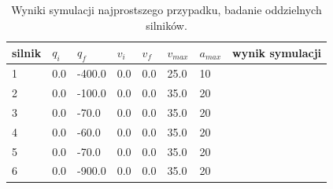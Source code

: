 \documentclass[a4paper, 12pt]{article}
\begin{document}
	\begin{table}[H]
	\centering
	\begin{tabular}{|m{2.5em}|m{4em}|m{4em}|m{4em}|m{4em}|m{4em}|m{4em}|m{5em}|}
	\hline
	silnik&$ q_i $ & $ q_f $ & $ v_i $ & $ v_f $ & $ v_{max} $ & $ a_{max} $&wynik symulacji\\
	\hline
	\hline
	\hspace{1em}1& 0.0 & -400.0 & 0.0 & 0.0 & 25.0 & 10&\hspace{2em}\checkmark\\ %
	\hline
	\hspace{1em}2& 0.0 & -100.0 & 0.0 & 0.0 & 35.0 & 20&\hspace{2em}\checkmark\\ %
	\hline
	\hspace{1em}3& 0.0 & -70.0 & 0.0 & 0.0 & 35.0 & 20&\hspace{2em}\checkmark\\ %
	\hline
	\hspace{1em}4& 0.0 & -60.0 & 0.0 & 0.0 & 35.0 & 20&\hspace{2em}\checkmark\\  %
	\hline
	\hspace{1em}5& 0.0 & -70.0 & 0.0 & 0.0 & 35.0 & 20&\hspace{2em}\checkmark\\  %
	\hline
	\hspace{1em}6& 0.0 & -900.0 & 0.0 & 0.0 & 35.0 & 20&\hspace{2em}\checkmark\\  %
	\hline
	\end{tabular}
	\caption{Wyniki symulacji najprostszego przypadku, badanie oddzielnych silników.}
	\label{tab:setup2}
	\end{table}
\end{document}
